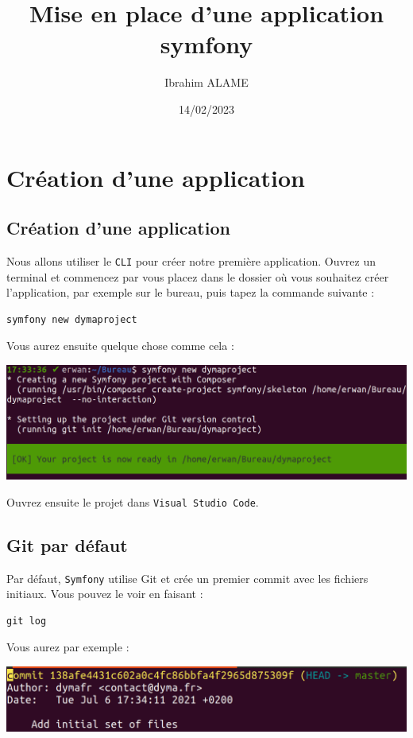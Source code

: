 \documentclass{article}
\title{Mise en place d'une application symfony}
\author{Ibrahim ALAME}
\date{14/02/2023}
\begin{document}
\maketitle

\section{Création d'une application}  
\subsection{Création d'une application}  
Nous allons utiliser le {\tt CLI} pour créer notre première application. Ouvrez un terminal et commencez par vous placez dans le dossier où vous souhaitez créer l'application, par exemple sur le bureau, puis tapez la commande suivante :
\begin{verbatim}
symfony new dymaproject
\end{verbatim}


Vous aurez ensuite quelque chose comme cela :
\begin{center}
\includegraphics[width=15cm]{images/image1.png}
\end{center}

Ouvrez ensuite le projet dans {\tt Visual Studio Code}.

\subsection{Git par défaut}
Par défaut, {\tt Symfony} utilise Git et crée un premier commit avec les fichiers initiaux. Vous pouvez le voir en faisant :

\begin{verbatim}
git log
\end{verbatim}

Vous aurez par exemple :
\begin{center}
\includegraphics[width=15cm]{images/image2.png}
\end{center}
\end{document}

